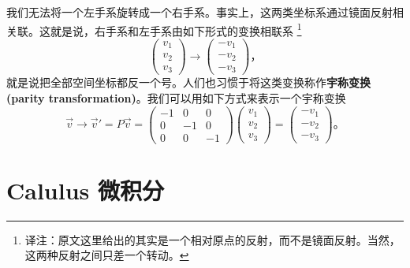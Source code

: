 
我们无法将一个左手系旋转成一个右手系。事实上，这两类坐标系通过镜面反射相关联。这就是说，右手系和左手系由如下形式的变换相联系%
\footnote{译注：原文这里给出的其实是一个相对原点的反射，而不是镜面反射。当然，这两种反射之间只差一个转动。}
\begin{equation}
\begin{pmatrix}
v_1 \\ v_2 \\ v_3
\end{pmatrix} \rightarrow
\begin{pmatrix}
-v_1 \\ -v_2 \\ -v_3
\end{pmatrix}\text{，}
\end{equation}
就是说把全部空间坐标都反一个号。人们也习惯于将这类变换称作{\bf 宇称变换(parity transformation)}。我们可以用如下方式来表示一个宇称变换
\begin{equation}
\vec{v} \rightarrow \vec{v}' = P\vec{v} = \begin{pmatrix}
-1 & 0 & 0 \\ 0 & -1 & 0 \\ 0 & 0 & -1
\end{pmatrix}
\begin{pmatrix}
v_1 \\ v_2 \\ v_3
\end{pmatrix} =
\begin{pmatrix}
-v_1 \\ -v_2 \\ -v_3
\end{pmatrix}\text{。}
\end{equation}

\chapter[微积分]{Calulus 微积分}\label{appendix.B}

